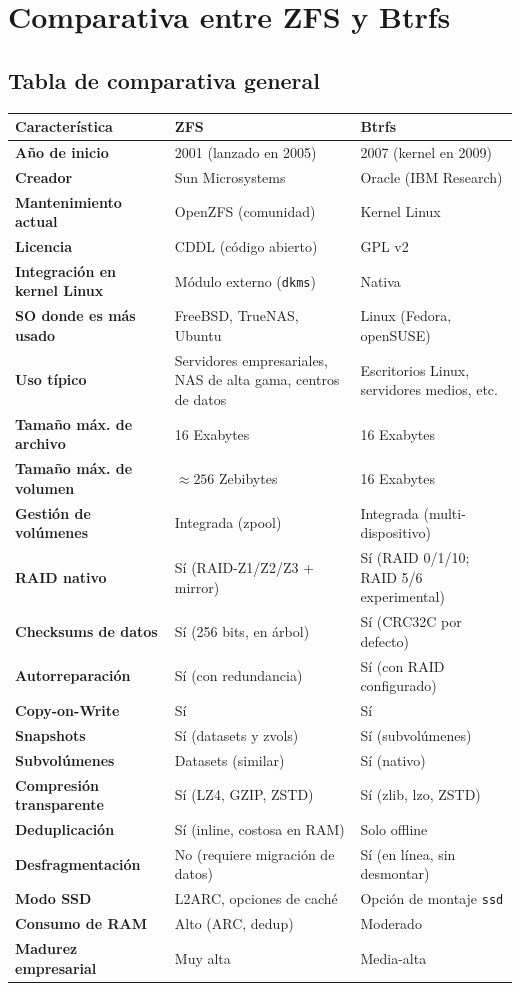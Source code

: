 \documentclass[12pt,letterpaper]{article}
\begin{document}
\newpage

\section{Comparativa entre ZFS y Btrfs}
\subsection{Tabla de comparativa general}
\begin{center}
  \renewcommand{\arraystretch}{1.4}
  \begin{tabular}{>{\bfseries}p{4.5cm} p{5.3cm} p{5.3cm}}
    \hline
    \textbf{Característica} & \textbf{ZFS} & \textbf{Btrfs} \\
    \hline
    Año de inicio & 2001 (lanzado en 2005) & 2007 (kernel en 2009) \\
    Creador & Sun Microsystems & Oracle (IBM Research) \\
    Mantenimiento actual & OpenZFS (comunidad) & Kernel Linux \\
    Licencia & CDDL (código abierto) & GPL v2 \\
    Integración en kernel Linux & Módulo externo (\texttt{dkms}) & Nativa \\
    SO donde es más usado & FreeBSD, TrueNAS, Ubuntu & Linux (Fedora, openSUSE) \\
    Uso típico & Servidores empresariales, NAS de alta gama, centros de datos & Escritorios Linux, servidores
    medios, etc. \\
    Tamaño máx. de archivo & 16 Exabytes & 16 Exabytes \\
    Tamaño máx. de volumen & $\approx 256$ Zebibytes & 16 Exabytes \\
    Gestión de volúmenes & Integrada (zpool) & Integrada (multi-dispositivo) \\
    RAID nativo & Sí (RAID-Z1/Z2/Z3 + mirror) & Sí (RAID 0/1/10; RAID 5/6 experimental) \\
    Checksums de datos & Sí (256 bits, en árbol) & Sí (CRC32C por defecto) \\
    Autorreparación & Sí (con redundancia) & Sí (con RAID configurado) \\
    Copy-on-Write & Sí & Sí \\
    Snapshots & Sí (datasets y zvols) & Sí (subvolúmenes) \\
    Subvolúmenes & Datasets (similar) & Sí (nativo) \\
    Compresión transparente & Sí (LZ4, GZIP, ZSTD) & Sí (zlib, lzo, ZSTD) \\
    Deduplicación & Sí (inline, costosa en RAM) & Solo offline \\
    Desfragmentación & No (requiere migración de datos) & Sí (en línea, sin desmontar) \\
    Modo SSD & L2ARC, opciones de caché & Opción de montaje \texttt{ssd} \\
    Consumo de RAM & Alto (ARC, dedup) & Moderado \\
    Madurez empresarial & Muy alta & Media-alta \\
    \hline
  \end{tabular}
\end{center}
\end{document}
